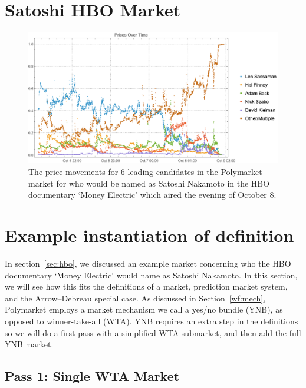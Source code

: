 













\section{Satoshi HBO Market}
\label{app:hbo}

\begin{figure}
  \centering
  \includegraphics[width=\textwidth]{figures/graph.png}
  \caption{The price movements for 6 leading candidates in the Polymarket market for who would be named as Satoshi Nakamoto in the HBO documentary `Money Electric' which aired the evening of October 8.}
  \label{fig:example}
\end{figure}

\section{Example instantiation of definition}
\label{app:example}

In section~\ref{sec:hbo}, we discussed an example market concerning who the HBO documentary `Money Electric' would name as Satoshi Nakamoto. In this section, we will see how this fits the definitions of a market, prediction market system, and the Arrow--Debreau special case. As discussed in Section~\ref{wf:mech}, Polymarket employs a market mechanism we call a yes/no bundle (YNB), as opposed to winner-take-all (WTA). YNB requires an extra step in the definitions so we will do a first pass with a simplified WTA submarket, and then add the full YNB market.

\subsection{Pass 1: Single WTA Market}

